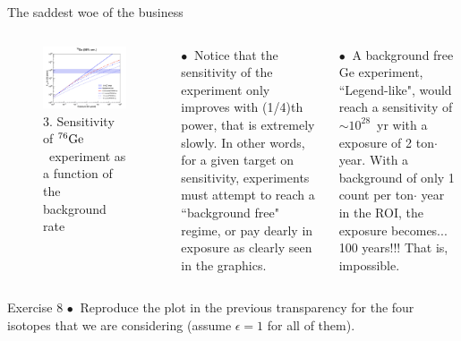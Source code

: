 \documentclass [aspectratio=169]{beamer}
\newcommand{\GE}{\ensuremath{{}^{76}{\rm Ge}}}
\begin{document}
 
 \begin{frame}{The saddest woe of the business}
 
 \begin{columns}
\begin{figure}
\includegraphics[scale=0.28]{ gesensi.png}
\caption{3. Sensitivity of \GE\ experiment as a function of the background rate}
\end{figure}

$\bullet~$ Notice that the sensitivity of the experiment only improves with (1/4)th power, that is extremely slowly. In other words, for a given target on sensitivity, experiments must attempt to reach a ``background free" regime, or pay dearly in exposure as clearly seen in the graphics.

$\bullet~$ A background free Ge experiment, ``Legend-like", would reach a sensitivity of $\sim 10^{28}$~yr with a exposure of 2 ton$\cdot$year. With a background of only 1 count per ton$\cdot$ year in the ROI, the exposure becomes... 100 years!!! That is, impossible. 
\end{columns}
\end{frame}

\begin{frame}{Exercise 8}
$\bullet~$ Reproduce the plot in the previous transparency for the four isotopes that we are considering (assume $\epsilon =1$ for all of them). 
\end{frame}
\end{document}
